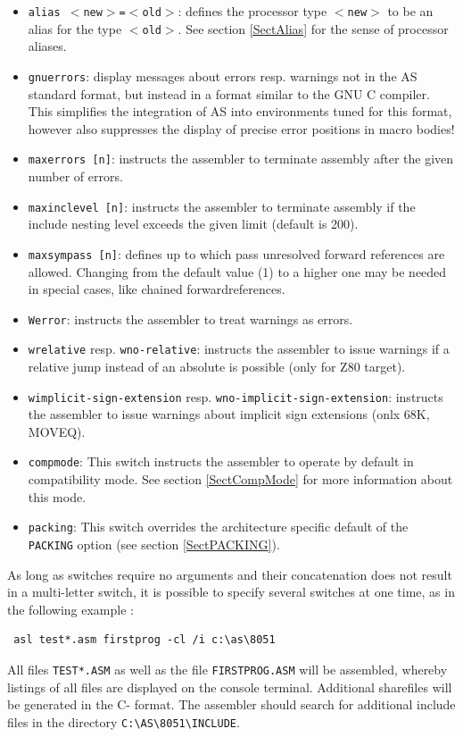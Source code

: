 \documentclass[12pt,twoside]{report}
\newcommand{\tty}[1]{{\tt #1}}
\newcommand{\asname}{{AS}}
\begin{document}
\begin{itemize}
{      a {\tt CPU} instruction.  If the selected target
      supports CPU arguments (see section \ref{SectCPU}), they may be used
      on the command line as well.  Using this switch with \verb!?! or {\tt list}
      as argument lists all implemented targets.}
\item{\tty{alias $<$new$>$=$<$old$>$}:
      defines the processor type \tty{$<$new$>$} to be an alias for the
      type \tty{$<$old$>$}.  See section \ref{SectAlias} for the sense of
      processor aliases.}
\item{{\tt gnuerrors}: display messages about errors resp. warnings not
      in the \asname{} standard format, but instead in a format similar to the
      GNU C compiler.  This simplifies the integration of \asname{} into
      environments tuned for this format, however also suppresses the
      display of precise error positions in macro bodies!}
\item{{\tt maxerrors [n]}: instructs the assembler to terminate
      assembly after the given number of errors.}
\item{{\tt maxinclevel [n]}: instructs the assembler to terminate
      assembly if the include nesting level exceeds the given limit
      (default is 200).}
\item{{\tt maxsympass [n]}: defines up to which pass unresolved forward
      references are allowed.  Changing from the default value (1) to
      a higher one may be needed in special cases, like chained
      forwardreferences.}
\item{{\tt Werror}: instructs the assembler to treat warnings as errors.}
\item{{\tt wrelative} resp. {\tt wno-relative}: instructs the assembler
      to issue warnings if a relative jump instead of an absolute is
      possible (only for Z80 target).}
\item{{\tt wimplicit-sign-extension} resp. {\tt wno-implicit-sign-extension}: instructs
      the assembler to issue warnings about implicit sign extensions
      (onlx 68K, MOVEQ).}
\item{\tty{compmode}: This switch instructs the assembler to operate by
      default in compatibility mode.  See section \ref{SectCompMode} for
      more information about this mode.}
\item{\tty{packing}: This switch overrides the architecture specific
      default of the {\tt PACKING} option (see section \ref{SectPACKING}).}
\end{itemize}
As long as switches require no arguments and their concatenation does
not result in a multi-letter switch, it is possible to specify several
switches at one time, as in the following example :
\begin{verbatim}
 asl test*.asm firstprog -cl /i c:\as\8051
\end{verbatim}
All files \tty{TEST*.ASM} as well as the file \tty{FIRSTPROG.ASM} will be
assembled, whereby listings of all files are displayed on the
console terminal.  Additional sharefiles will be generated in the C-
format.  The assembler should search for additional include files
in the directory \verb!C:\AS\8051\INCLUDE!.
\end{document}
